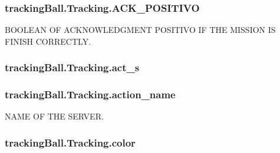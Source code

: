\subsubsection[{\texorpdfstring{A\+C\+K\+\_\+\+P\+O\+S\+I\+T\+I\+VO}{ACK_POSITIVO}}]{\setlength{\rightskip}{0pt plus 5cm}tracking\+Ball.\+Tracking.\+A\+C\+K\+\_\+\+P\+O\+S\+I\+T\+I\+VO}\hypertarget{classtrackingBall_1_1Tracking_aadfc96c3a6be143bb62858a7ac2fc840}{}\label{classtrackingBall_1_1Tracking_aadfc96c3a6be143bb62858a7ac2fc840}


B\+O\+O\+L\+E\+AN OF A\+C\+K\+N\+O\+W\+L\+E\+D\+G\+M\+E\+NT P\+O\+S\+I\+T\+I\+VO IF T\+HE M\+I\+S\+S\+I\+ON IS F\+I\+N\+I\+SH C\+O\+R\+R\+E\+C\+T\+LY. 

\subsubsection[{\texorpdfstring{act\+\_\+s}{act_s}}]{\setlength{\rightskip}{0pt plus 5cm}tracking\+Ball.\+Tracking.\+act\+\_\+s}\hypertarget{classtrackingBall_1_1Tracking_a46586a7a898c757afcff8d89a7b55d77}{}\label{classtrackingBall_1_1Tracking_a46586a7a898c757afcff8d89a7b55d77}
\subsubsection[{\texorpdfstring{action\+\_\+name}{action_name}}]{\setlength{\rightskip}{0pt plus 5cm}tracking\+Ball.\+Tracking.\+action\+\_\+name}\hypertarget{classtrackingBall_1_1Tracking_a6b17306fa008c6665ff8a5798ee27ba8}{}\label{classtrackingBall_1_1Tracking_a6b17306fa008c6665ff8a5798ee27ba8}


N\+A\+ME OF T\+HE S\+E\+R\+V\+ER. 

\subsubsection[{\texorpdfstring{color}{color}}]{\setlength{\rightskip}{0pt plus 5cm}tracking\+Ball.\+Tracking.\+color}\hypertarget{classtrackingBall_1_1Tracking_aa5264f9fd30dcb6818c64175c9aa9a88}{}\label{classtrackingBall_1_1Tracking_aa5264f9fd30dcb6818c64175c9aa9a88}


